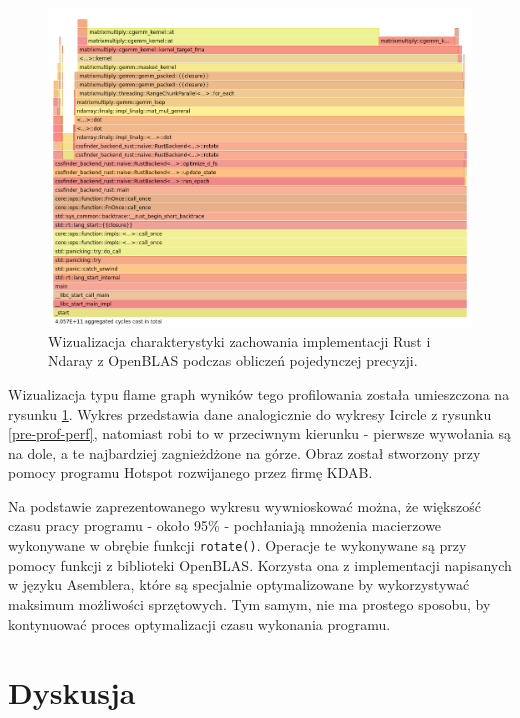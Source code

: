 \documentclass[11pt, a4paper]{article}
\newcommand{\code}[1]{\texttt{#1}}
\begin{document}
\begin{sloppypar}
    \begin{figure}[!ht]
      \centering
      \includegraphics[width=1.0\textwidth]{"resources/rust_flame_graph_perf.png"}
      \caption{Wizualizacja charakterystyki zachowania implementacji Rust i Ndaray z OpenBLAS podczas obliczeń pojedynczej precyzji.}
      \label{rust-flame-graph-prof}
    \end{figure}

    Wizualizacja typu flame graph wyników tego profilowania została umieszczona na rysunku
    \ref{rust-flame-graph-prof}. Wykres przedstawia dane analogicznie do wykresy Icircle
    z rysunku \ref{pre-prof-perf}, natomiast robi to w przeciwnym kierunku - pierwsze wywołania
    są na dole, a te najbardziej zagnieżdżone na górze. Obraz został stworzony przy pomocy
    programu Hotspot\cite{HOTSPOT} rozwijanego przez firmę KDAB.

    Na podstawie zaprezentowanego wykresu wywnioskować można, że większość czasu pracy programu
    - około 95\% - pochłaniają mnożenia macierzowe wykonywane w obrębie funkcji \code{rotate()}.
    Operacje te wykonywane są przy pomocy funkcji z biblioteki OpenBLAS. Korzysta ona z implementacji
    napisanych w języku Asemblera, które są specjalnie optymalizowane by wykorzystywać
    maksimum możliwości sprzętowych. Tym samym, nie ma prostego sposobu, by kontynuować proces
    optymalizacji czasu wykonania programu.

    \FloatBarrier

    \section{Dyskusja}

\end{sloppypar}
\end{document}
